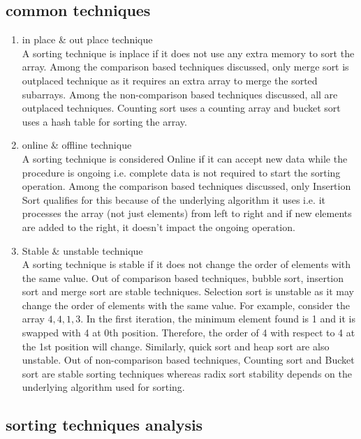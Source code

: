 \documentclass[
10pt, %
a4paper, %
oneside, %
headinclude,footinclude, %
BCOR5mm, %
]{scrartcl}
\begin{document}

\subsection{common techniques}
\begin{enumerate}[noitemsep]
\item in place \& out place technique
\\
A sorting technique is inplace if it does not use any extra memory to sort the array. 
Among the comparison based techniques discussed, only merge sort is outplaced technique as it requires an extra array to merge the sorted subarrays. 
Among the non-comparison based techniques discussed, all are outplaced techniques. Counting sort uses a counting array and bucket sort uses a hash table for sorting the array. 

\item online \& offline technique
\\
A sorting technique is considered Online if it can accept new data while the procedure is ongoing i.e. complete data is not required to start the sorting operation. 
Among the comparison based techniques discussed, only Insertion Sort qualifies for this because of the underlying algorithm it uses i.e. it processes the array (not just elements) from left to right and if new elements are added to the right, it doesn’t impact the ongoing operation. 

\item Stable \& unstable technique
\\
A sorting technique is stable if it does not change the order of elements with the same value. 
Out of comparison based techniques, bubble sort, insertion sort and merge sort are stable techniques. Selection sort is unstable as it may change the order of elements with the same value. For example, consider the array $4, 4, 1, 3.$ 
In the first iteration, the minimum element found is 1 and it is swapped with 4 at 0th position. Therefore, the order of 4 with respect to 4 at the 1st position will change. Similarly, quick sort and heap sort are also unstable. 
Out of non-comparison based techniques, Counting sort and Bucket sort are stable sorting techniques whereas radix sort stability depends on the underlying algorithm used for sorting. 
\end{enumerate}



\subsection{sorting techniques analysis}
\end{document}
